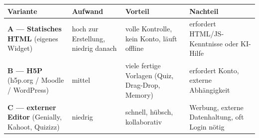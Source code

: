 \documentclass[
  ngerman,
  a4paper,
  DIV=11]{scrreprt}
\begin{document}
\begin{longtable}[]{@{}
  >{\raggedright\arraybackslash}p{}
  >{\raggedright\arraybackslash}p{}
  >{\raggedright\arraybackslash}p{}
  >{\raggedright\arraybackslash}p{}@{}}
\toprule\noalign{}
\begin{minipage}[b]{\linewidth}\raggedright
Variante
\end{minipage} & \begin{minipage}[b]{\linewidth}\raggedright
Aufwand
\end{minipage} & \begin{minipage}[b]{\linewidth}\raggedright
Vorteil
\end{minipage} & \begin{minipage}[b]{\linewidth}\raggedright
Nachteil
\end{minipage} \\
\midrule\noalign{}
\endhead
\bottomrule\noalign{}
\endlastfoot
\textbf{A --- Statisches HTML} (eigenes Widget) & hoch zur Erstellung,
niedrig danach & volle Kontrolle, kein Konto, läuft offline & erfordert
HTML/JS-Kenntnisse oder KI-Hilfe \\
\textbf{B --- H5P} (h5p.org / Moodle / WordPress) & mittel & viele
fertige Vorlagen (Quiz, Drag-Drop, Memory) & erfordert Konto, externe
Abhängigkeit \\
\textbf{C --- externer Editor} (Genially, Kahoot, Quizizz) & niedrig &
schnell, hübsch, kollaborativ & Werbung, externe Datenhaltung, oft Login
nötig \\
\end{longtable}
\end{document}
